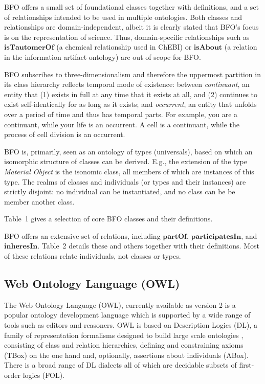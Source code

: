 \documentclass[10pt]{bmc_article}
\newcommand{\mirel}[1]{\ensuremath{\mathrm{\mathbf{#1}}}}
\newenvironment{bmcformat}{\baselineskip20pt\sloppy\setboolean{publ}{false}}{\baselineskip20pt\sloppy}
\begin{document}
\begin{bmcformat}
BFO offers a small set of foundational classes together with definitions, and a set of relationships intended to be used in multiple ontologies. Both classes and relationships are domain-independent, albeit it is clearly stated that BFO's focus is on the representation of science. 
Thus, domain-specific relationships such as $\mirel{isTautomerOf}$ (a chemical relationship used in ChEBI) or $\mirel{isAbout}$ (a relation in the information artifact ontology) are out of scope for BFO. 

BFO subscribes to three-dimensionalism and therefore the uppermost partition in its class hierarchy reflects temporal mode of existence: between \textit{continuant}, an entity that (1) exists in full at any time that it exists at all, and (2) continues to exist self-identically for as long as it exists; and \textit{occurrent}, an entity that unfolds over a period of time and thus has temporal parts.  For example, you are a continuant, while your life is an occurrent.  A cell is a continuant, while the process of cell division is an occurrent.  

BFO is, primarily, seen as an ontology of types (universals), based on which an isomorphic structure of classes can be derived. E.g., the extension of the type \emph{Material Object} is the isonomic class, all members of which are instances of this type. The realms of classes and individuals (or types and their instances) are strictly disjoint: no individual can be instantiated, and no class can be be member another class.   

Table~1 gives a selection of core BFO classes and their definitions.

BFO offers an extensive set of relations, including $\mirel{partOf}$, $\mirel{participatesIn}$, and $\mirel{inheresIn}$. 
Table~2 details these and others together with their definitions. Most of these relations relate individuals, not classes or types. 

\subsection*{Web Ontology Language (OWL)}

The Web Ontology Language (OWL), currently available as version 2 \cite{grau2008} is a popular ontology 
development language which is supported by a wide range of tools 
such as editors and reasoners. OWL is based on Description Logics (DL), a family of 
representation formalisms designed to build
large scale ontologies
\cite{baader2007dlhandbook}, consisting of class and relation hierarchies, defining and 
constraining axioms (TBox) on the one hand and, optionally, assertions about 
individuals (ABox). There is a broad range of DL dialects all of which are 
decidable subsets of first-order logics (FOL). 


\end{bmcformat}
\end{document}
